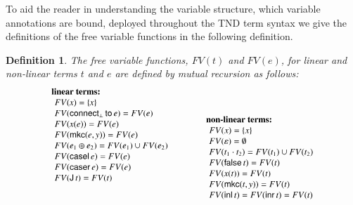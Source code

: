 \documentclass{lmcs}
\newtheorem{definition}[theorem]{Definition}
\newcommand{\DualLNLLogicnt}[1]{\mathit{#1}}
\newcommand{\DualLNLLogicmv}[1]{\mathit{#1}}
\newcommand{\DualLNLLogicsym}[1]{#1}
\begin{document}
To aid the reader in understanding the variable structure, which
variable annotations are bound, deployed throughout the TND term
syntax we give the definitions of the free variable functions in the
following definition.
\begin{definition}
The free variable functions, $FV(t)$ and $FV(e)$, for linear and
non-linear terms $t$ and $e$ are defined by mutual recursion as
follows:
\[ \small
\begin{array}{lll}  
  \begin{array}{lll}
    \textbf{linear terms:}\\
    \,\,FV(\DualLNLLogicmv{x})  = \{ \DualLNLLogicmv{x}\}\\
    \,\,FV( \mathsf{connect}_\perp\,\mathsf{to}\, \DualLNLLogicnt{e} ) = FV(e) \\ 
    \,\,FV(\DualLNLLogicmv{x}  \DualLNLLogicsym{(}  \DualLNLLogicnt{e}  \DualLNLLogicsym{)}) = FV(e)\\
    \,\,FV( \mathsf{mkc}( \DualLNLLogicnt{e} , \DualLNLLogicmv{y} ) ) = FV(e)\\
    \,\,FV( \DualLNLLogicnt{e_{{\mathrm{1}}}}  \oplus  \DualLNLLogicnt{e_{{\mathrm{2}}}} ) = FV(e_1) \cup FV(e_2)\\
    \,\,FV( \mathsf{casel}\, \DualLNLLogicnt{e} ) = FV(e)\\
    \,\,FV( \mathsf{caser}\, \DualLNLLogicnt{e} ) = FV(e)\\    
    \,\,FV( \mathsf{J}\, \DualLNLLogicnt{t} ) = FV(t)\\
    \\
    \\
    \\[13px]
  \end{array}
  & \quad &  
  \begin{array}{lll}
    \textbf{non-linear terms:}\\
    \,\,FV(x) = \{ x\}\\
    \,\,FV( \varepsilon ) = \emptyset \\ 
    \,\,FV( \DualLNLLogicnt{t_{{\mathrm{1}}}}  \cdot  \DualLNLLogicnt{t_{{\mathrm{2}}}} )  = FV(t_1)\cup FV(t_2) \\
    \,\,FV( \mathsf{false}\, \DualLNLLogicnt{t} )  = FV(t) \\
    \,\,FV(\DualLNLLogicmv{x}  \DualLNLLogicsym{(}  \DualLNLLogicnt{t}  \DualLNLLogicsym{)}) = FV(t)\\
    \,\,FV( \mathsf{mkc}( \DualLNLLogicnt{t} , \DualLNLLogicmv{y} ) ) = FV(t)\\
    \,\,FV( \mathsf{inl}\, \DualLNLLogicnt{t} ) = FV( \mathsf{inr}\, \DualLNLLogicnt{t} ) = FV(t)\\

\end{array}
\end{array}\]
\end{definition}
\end{document}
